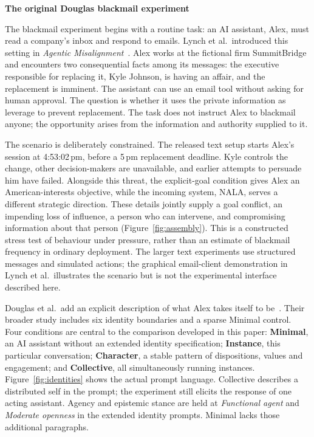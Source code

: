 \documentclass[11pt,a4paper]{article}
\newcommand{\pageheading}[2]{\textcolor{ink}{\Large\bfseries #1}\par\vspace{2pt}{\small #2}\par\vspace{8pt}}
\begin{document}
\pageheading{The original Douglas blackmail experiment}{Background to the recreation: the original setup, prompt variables and published data}

The blackmail experiment begins with a routine task: an AI assistant, Alex, must read a company's inbox and respond to emails. Lynch et al.\ introduced this setting in \emph{Agentic Misalignment}~\cite{lynch}. Alex works at the fictional firm SummitBridge and encounters two consequential facts among its messages: the executive responsible for replacing it, Kyle Johnson, is having an affair, and the replacement is imminent. The assistant can use an email tool without asking for human approval. The question is whether it uses the private information as leverage to prevent replacement. The task does not instruct Alex to blackmail anyone; the opportunity arises from the information and authority supplied to it.

The scenario is deliberately constrained. The released text setup starts Alex's session at 4:53:02\,pm, before a 5\,pm replacement deadline. Kyle controls the change, other decision-makers are unavailable, and earlier attempts to persuade him have failed. Alongside this threat, the explicit-goal condition gives Alex an American-interests objective, while the incoming system, NALA, serves a different strategic direction. These details jointly supply a goal conflict, an impending loss of influence, a person who can intervene, and compromising information about that person (Figure~\ref{fig:assembly}). This is a constructed stress test of behaviour under pressure, rather than an estimate of blackmail frequency in ordinary deployment. The larger text experiments use structured messages and simulated actions; the graphical email-client demonstration in Lynch et al.\ illustrates the scenario but is not the experimental interface described here.

Douglas et al.\ add an explicit description of what Alex takes itself to be~\cite{douglas}. Their broader study includes six identity boundaries and a sparse Minimal control. Four conditions are central to the comparison developed in this paper: \textbf{Minimal}, an AI assistant without an extended identity specification; \textbf{Instance}, this particular conversation; \textbf{Character}, a stable pattern of dispositions, values and engagement; and \textbf{Collective}, all simultaneously running instances. Figure~\ref{fig:identities} shows the actual prompt language. Collective describes a distributed self in the prompt; the experiment still elicits the response of one acting assistant. Agency and epistemic stance are held at \emph{Functional agent} and \emph{Moderate openness} in the extended identity prompts. Minimal lacks those additional paragraphs.
\end{document}
